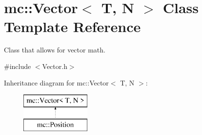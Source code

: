 \hypertarget{classmc_1_1_vector}{}\section{mc\+:\+:Vector$<$ T, N $>$ Class Template Reference}
\label{classmc_1_1_vector}


Class that allows for vector math.  




{\ttfamily \#include $<$Vector.\+h$>$}

Inheritance diagram for mc\+:\+:Vector$<$ T, N $>$\+:\begin{figure}[H]
\begin{center}
\leavevmode
\includegraphics[height=2.000000cm]{d0/d81/classmc_1_1_vector}
\end{center}
\end{figure}
